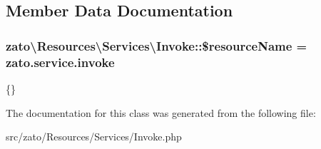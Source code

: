 \subsection{Member Data Documentation}
\hypertarget{classzato_1_1_resources_1_1_services_1_1_invoke_a0b74d2abc0d3878703c6da02b2db6972}{}
\subsubsection[{\$resource\+Name}]{\setlength{\rightskip}{0pt plus 5cm}zato\textbackslash{}\+Resources\textbackslash{}\+Services\textbackslash{}\+Invoke\+::\$resource\+Name = \textquotesingle{}zato.\+service.\+invoke\textquotesingle{}\hspace{0.3cm}{\ttfamily [protected]}}\label{classzato_1_1_resources_1_1_services_1_1_invoke_a0b74d2abc0d3878703c6da02b2db6972}
\{\} 

The documentation for this class was generated from the following file\+:\begin{DoxyCompactItemize}
\item 
src/zato/\+Resources/\+Services/Invoke.\+php\end{DoxyCompactItemize}
